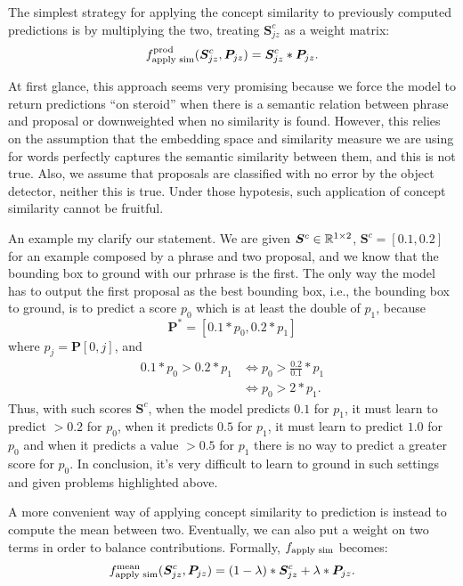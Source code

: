 \documentclass{article}
\begin{document}
The simplest strategy for applying the concept similarity to
previously computed predictions is by multiplying the two, treating
$\bm{S}^c_{jz}$ as a weight matrix:
\begin{equation}
  f_{\text{apply sim}}^{\text{prod}} (\bm{S}^c_{jz}, \bm{P}_{jz}) = \bm{S}^c_{jz} * \bm{P}_{jz}.
\end{equation}

At first glance, this approach seems very promising because we force
the model to return predictions ``on steroid'' when there is a
semantic relation between phrase and proposal or downweighted when no
similarity is found. However, this relies on the assumption that the
embedding space and similarity measure we are using for words
perfectly captures the semantic similarity between them, and this is
not true. Also, we assume that proposals are classified with no error
by the object detector, neither this is true. Under those hypotesis,
such application of concept similarity cannot be fruitful. 

An example my clarify our statement. We are given $\bm{S}^c \in
\mathbb{R}^{1 \times 2}$, $\bm{S}^c = [0.1, 0.2]$ for an example composed by a
phrase and two proposal, and we know that the bounding box to ground
with our prhrase is the first. The only way the model has to output
the first proposal as the best bounding box, i.e., the bounding box to
ground, is to predict a score $p_{0}$ which is at least the double of
$p_{1}$, because
\begin{equation}
  \bm{P}^* = [0.1 * p_{0}, 0.2 * p_{1}]
\end{equation}
where $p_{j} = \bm{P}[0, j]$, and 
\begin{equation}
\begin{split}
0.1 * p_{0} > 0.2 * p_{1} & \iff p_{0} >  \frac{0.2}{0.1} * p_{1} \\
  & \iff p_{0} > 2 * p_{1}.
\end{split}
\end{equation}
Thus, with such scores $\bm{S}^c$, when the model predicts $0.1$ for
$p_1$, it must learn to predict $> 0.2$ for $p_0$, when it predicts
$0.5$ for $p_1$, it must learn to predict $1.0$ for $p_0$ and when it
predicts a value $> 0.5$ for $p_1$ there is no way to predict a
greater score for $p_0$. In conclusion, it's very difficult to learn
to ground in such settings and given problems highlighted above.

A more convenient way of applying concept similarity to prediction is
instead to compute the mean between two. Eventually, we can also put a
weight on two terms in order to balance contributions. Formally,
$f_{\text{apply sim}}$ becomes:
\begin{equation}
  f_{\text{apply sim}}^{\text{mean}} (\bm{S}^c_{jz}, \bm{P}_{jz}) = (1 - \lambda) * \bm{S}^c_{jz} + \lambda * \bm{P}_{jz}.
\end{equation}
\end{document}

